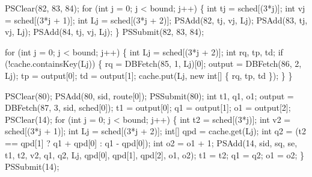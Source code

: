 \documentclass{article}
\def\nwendcode{\endtrivlist \endgroup}
\let\nwdocspar=\par
\theoremstyle{definition}
\begin{document}
PSClear(82, 83, 84);
for (int j = 0; j < bound; j++) \{
  int tj = sched[(3*j)];
  int vj = sched[(3*j + 1)];
  int Lj = sched[(3*j + 2)];
  PSAdd(82, tj, vj, Lj);
  PSAdd(83, tj, vj, Lj);
  PSAdd(84, tj, vj, Lj);
\}
PSSubmit(82, 83, 84);
\nwendcode{}\nwdocspar
\nwenddocs{}\endmoddef{}
for (int j = 0; j < bound; j++) \{
  int Lj = sched[(3*j + 2)];
  int rq, tp, td;
  if (!cache.containsKey(Lj)) \{
    rq = DBFetch(85, 1, Lj)[0];
    output = DBFetch(86, 2, Lj);
    tp = output[0];
    td = output[1];
    cache.put(Lj, new int[] \{ rq, tp, td \});
  \}
\}
\nwendcode{}\nwdocspar
\nwenddocs{}\endmoddef{}
PSClear(80);
PSAdd(80, sid, route[0]);
PSSubmit(80);
int t1, q1, o1;
output = DBFetch(87, 3, sid, sched[0]);
t1 = output[0];
q1 = output[1];
o1 = output[2];
PSClear(14);
for (int j = 0; j < bound; j++) \{
  int t2 = sched[(3*j)];
  int v2 = sched[(3*j + 1)];
  int Lj = sched[(3*j + 2)];
  int[] qpd = cache.get(Lj);
  int q2 = (t2 == qpd[1] ? q1 + qpd[0] : q1 - qpd[0]);
  int o2 = o1 + 1;
  PSAdd(14, sid, sq, se, t1, t2, v2, q1, q2, Lj,
        qpd[0], qpd[1], qpd[2], o1, o2);
  t1 = t2;
  q1 = q2;
  o1 = o2;
\}
PSSubmit(14);
\nwendcode{}\nwdocspar
\end{document}

